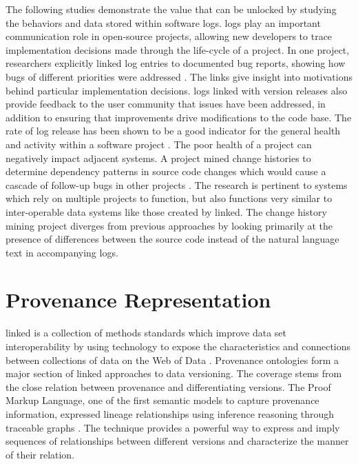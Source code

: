 The following studies demonstrate the value that can be unlocked by studying the behaviors and data stored within software \glspl{log}.
\Glspl{log} play an important communication role in open-source projects, allowing new developers to trace implementation decisions made through the life-cycle of a project.
In one project, researchers explicitly linked \gls{log} entries to documented bug reports, showing how bugs of different priorities were addressed \cite{Chen:2004:OCL:990374.990391}.
The links give insight into motivations behind particular implementation decisions.
\Glspl{log} linked with \gls{version} releases also provide feedback to the user community that issues have been addressed, in addition to ensuring that improvements drive modifications to the code base.
The rate of \gls{log} release has been shown to be a good indicator for the general health and activity within a software project \cite{German03automatingthe}.
The poor health of a project can negatively impact adjacent systems.
A project mined change histories to determine dependency patterns in source code changes which would cause a cascade of follow-up bugs in other projects \cite{6132954}.
The research is pertinent to systems which rely on multiple projects to function, but also functions very similar to inter-operable data systems like those created by \gls{linked}.
The change history mining project diverges from previous approaches by looking primarily at the presence of differences between the source code instead of the natural language text in accompanying logs.

\section{Provenance Representation} \label{sec:provmod}

\Gls{linked} is a collection of methods standards which improve data set interoperability by using technology to expose the characteristics and connections between collections of data on the Web of Data \cite{ld}.
Provenance ontologies form a major section of \gls{linked} approaches to data versioning.
The coverage stems from the close relation between provenance and differentiating versions.
The Proof Markup Language, one of the first semantic models to capture provenance information, expressed lineage relationships using inference reasoning through traceable graphs \cite{daSilva2006381}.
The technique provides a powerful way to express and imply sequences of relationships between different versions and characterize the manner of their relation.

